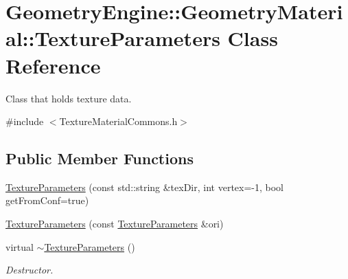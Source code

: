 \hypertarget{class_geometry_engine_1_1_geometry_material_1_1_texture_parameters}{}\section{Geometry\+Engine\+::Geometry\+Material\+::Texture\+Parameters Class Reference}
\label{class_geometry_engine_1_1_geometry_material_1_1_texture_parameters}


Class that holds texture data.  




{\ttfamily \#include $<$Texture\+Material\+Commons.\+h$>$}

\subsection*{Public Member Functions}
\begin{DoxyCompactItemize}
\item 
\mbox{\hyperlink{class_geometry_engine_1_1_geometry_material_1_1_texture_parameters_adad5f57ac5e9fc474ba2d5fa82439758}{Texture\+Parameters}} (const std\+::string \&tex\+Dir, int vertex=-\/1, bool get\+From\+Conf=true)
\item 
\mbox{\hyperlink{class_geometry_engine_1_1_geometry_material_1_1_texture_parameters_abbda2d6bc0bfc273cd8454acc8b326b7}{Texture\+Parameters}} (const \mbox{\hyperlink{class_geometry_engine_1_1_geometry_material_1_1_texture_parameters}{Texture\+Parameters}} \&ori)
\item 
\mbox{\label{class_geometry_engine_1_1_geometry_material_1_1_texture_parameters_ae5b4b1b62fc5e36548b568183c21c13e}} 
virtual \mbox{\hyperlink{class_geometry_engine_1_1_geometry_material_1_1_texture_parameters_ae5b4b1b62fc5e36548b568183c21c13e}{$\sim$\+Texture\+Parameters}} ()
\begin{DoxyCompactList}\small\item\em Destructor. \end{DoxyCompactList}\end{DoxyCompactItemize}
